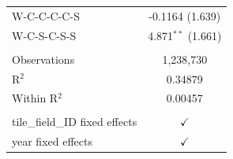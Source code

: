 \begin{table}[H]
\begin{tabular}{lc}
      W-C-C-C-C-S                     & -0.1164 (1.639)\\   
      W-C-S-C-S-S                     & 4.871$^{**}$ (1.661)\\   
       \\
      Observations                    & 1,238,730\\  
      R$^2$                           & 0.34879\\  
      Within R$^2$                    & 0.00457\\  
       \\
      tile\_field\_ID fixed effects   & $\checkmark$\\   
      year fixed effects              & $\checkmark$\\   
      \bottomrule
   \end{tabular}
\end{table}


